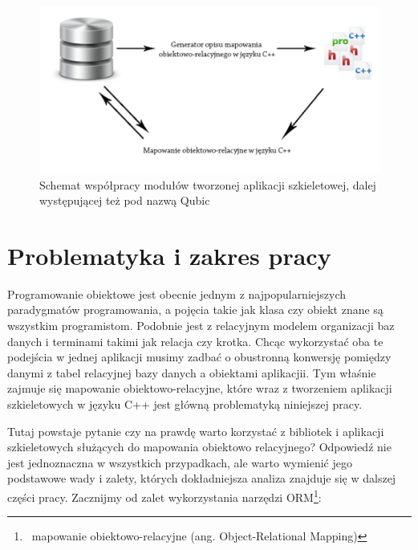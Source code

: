 \documentclass[12pt]{report}
\begin{document}
\begin{figure}[h]
\centering
\includegraphics[width=\textwidth]{resources/coop.png}
\caption[Schemat współpracy modułów tworzonej aplikacji szkieletowej]{Schemat współpracy modułów tworzonej aplikacji szkieletowej, dalej występującej też pod nazwą Qubic}
\end{figure}

\section{Problematyka i zakres pracy}

Programowanie obiektowe jest obecnie jednym z najpopularniejszych pa\-ra\-dy\-gma\-tów programowania, a pojęcia takie jak klasa czy obiekt znane są wszystkim programistom.
Podobnie jest z relacyjnym modelem organizacji baz danych i terminami takimi jak relacja czy krotka. Chcąc wykorzystać oba te podejścia w jednej aplikacji musimy zadbać o 
obustronną konwersję pomiędzy danymi z tabel relacyjnej bazy danych a obiektami aplikacjii. Tym właśnie zajmuje się mapowanie obiektowo-relacyjne, które wraz z tworzeniem 
aplikacji szkieletowych w języku C++ jest główną problematyką niniejszej pracy.

Tutaj powstaje pytanie czy na prawdę warto korzystać z bibliotek i aplikacji szkieletowych służących do mapowania obiektowo relacyjnego? Od\-po\-wiedź nie jest
jednoznaczna w wszystkich przypadkach, ale warto wymienić jego podstawowe wady i zalety, których dokładniejsza analiza znajduje się w dalszej części pracy. Zacznijmy od zalet 
wykorzystania narzędzi ORM\footnote{~mapowanie obiektowo-relacyjne (ang. Object-Relational Mapping)}:
\end{document}
